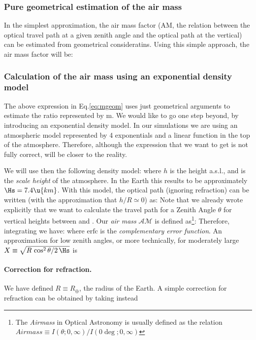 \subsubsection{Pure geometrical estimation of the air mass}

In the simplest approximation, the air mass factor (AM, the relation
between the optical travel path at a given zenith angle and the
optical path at the vertical) can be estimated from geometrical
consideratins. Using this simple approach, the air mass factor will
be:
%
\mgeomeq

\subsubsection{Calculation of the air mass using an 
exponential density model}

The above expression in Eq.\eqref{eq:mgeom} uses just geometrical 
arguments to estimate the ratio represented by m. We would like to go
one step beyond, by introducing an exponential density model. In our
simulations we are using an atmospheric model represented by 4
exponentials and a linear function in the top of the
atmosphere. Therefore, although the expression that we want to get is
not fully correct, will be closer to the reality.

We will use then the following density model:
%
\denseq
%
where $h$ is the height a.s.l., and \Hs is the \emph{scale height} of
the atmosphere. In the Earth this results to be approximately $\Hs =
7.4\u{km}$. With this model, the optical path (ignoring refraction)
can be written (with the approximation that $h/R \simeq 0$) as:
%
\optpathredeq
%
Note that we already wrote explicitly that we want to calculate the
travel path for a Zenith Angle $\theta$ for vertical heights between
\ho and \hv. Our \emph{air mass} $\mathcal{AM}$ is defined
as\footnote{The \emph{Airmass} in Optical Astronomy is usually defined
  as the relation $\mathit{Airmass} \equiv
  {I(\theta;0,\infty)}/{I(0\deg;0,\infty)} $}:
%
\AMdefeq
%
Therefore, integrating we have:
%
\AMfulleq
%
where $\mathrm{erfc}$ is the \emph{complementary error function}. An
approximation for low zenith angles, or more technically, for
moderately large $X\equiv\sqrt{{R\,\cos^2\theta}/{2\,\Hs}}$ is
%
\AMapproxeq

\paragraph{Correction for refraction.} We have defined $R \equiv
R_\oplus$, the radius of the Earth. A simple correction for refraction
can be obtained by taking instead
%

